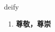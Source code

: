 
\begin{frame}
{\huge deify}
\begin{center}
\begin{enumerate}\Large
  \item \textbf{尊敬，尊崇}
\end{enumerate}
\end{center}
\end{frame}
